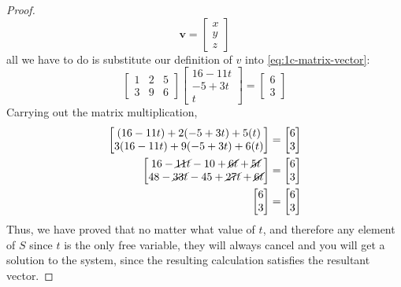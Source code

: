 \documentclass[]{article}
\begin{document}
\begin{proof}
\begin{equation}
	\mathbf{v} = \begin{bmatrix}
	x \\
	y \\
	z
	\end{bmatrix}
\end{equation}
all we have to do is substitute our definition of \(v\) into \autoref{eq:1c-matrix-vector}:
\begin{equation}
	\begin{bmatrix}
	1 & 2 & 5 \\
	3 & 9 & 6 
	\end{bmatrix}
	\begin{bmatrix}
	16 - 11t \\
	-5 + 3t \\
	t
	\end{bmatrix}
	=
	\begin{bmatrix}
	6 \\
	3
	\end{bmatrix}
\end{equation}
Carrying out the matrix multiplication, 
\begin{align}
	\begin{bmatrix}
	(16 - 11t) + 2(-5 + 3t) + 5(t) \\
	3(16 - 11t) + 9(-5 + 3t) + 6(t)
	\end{bmatrix}
	&=
	\begin{bmatrix}
	6 \\
	3
	\end{bmatrix} \\
	\begin{bmatrix}
	16 - \cancel{11t} - 10 + \cancel{6t} + \cancel{5t} \\
	48 - \cancel{33t} - 45 + \cancel{27t} + \cancel{6t}
	\end{bmatrix}
	&=
	\begin{bmatrix}
	6 \\
	3
	\end{bmatrix} \\
	\begin{bmatrix}
	6 \\
	3
	\end{bmatrix}
	&=
	\begin{bmatrix}
	6 \\
	3
	\end{bmatrix}
\end{align}
Thus, we have proved that no matter what value of \(t\), and therefore any element of \(S\) since \(t\) is the only free variable, they will always cancel and you will get a solution to the system, since the resulting calculation satisfies the resultant vector. 
\end{proof}
\end{document}

